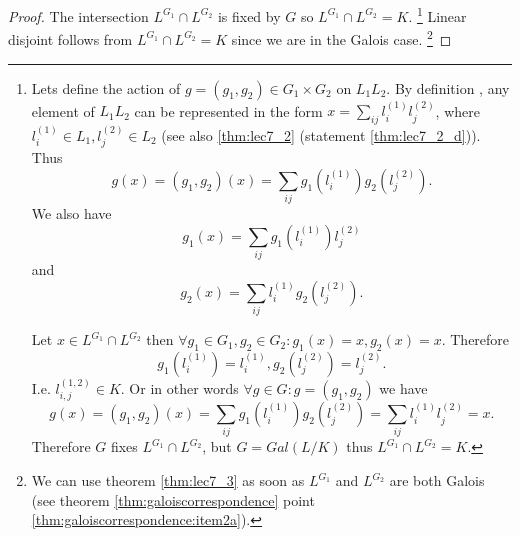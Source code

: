 \begin{proposition}
\begin{enumerate}
\begin{proof}
      The intersection $L^{G_1} \cap L^{G_2}$ is fixed by $G$ so
      $L^{G_1} \cap L^{G_2} = K$.
      \footnote{
        Lets define the action of $g = (g_1, g_2) \in G_1 \times G_2$
        on $L_1L_2$. By definition ,
        any element of $L_1L_2$ can be represented in the form $x =
        \sum_{ij} l_i^{(1)}l_j^{(2)}$, where
        $l_i^{(1)} \in L_1, l_j^{(2)} \in L_2$
        (see also \autoref{thm:lec7_2} (statement
        \ref{thm:lec7_2_d})). Thus
        \[
        g(x) = (g_1, g_2)(x) = \sum_{ij} 
        g_1\left(l_i^{(1)}\right)
        g_2\left(l_j^{(2)}\right).
        \]
        We also have
        \[
        g_1(x) = \sum_{ij} 
        g_1\left(l_i^{(1)}\right)
        l_j^{(2)}
        \]
        and
        \[
        g_2(x) = \sum_{ij} 
        l_i^{(1)}
        g_2\left(l_j^{(2)}\right).
        \]
        
        Let $x \in L^{G_1} \cap L^{G_2}$ then $\forall g_1 \in
        G_1, g_2 \in G_2: g_1(x) = x, g_2(x) = x$.
        Therefore
        \[
        g_1\left(l_i^{(1)}\right) = l_i^{(1)},
        g_2\left(l_j^{(2)}\right) = l_j^{(2)}.
        \]
        I.e. $l_{i,j}^{(1,2)} \in K$.
        Or in other words
        $\forall g \in G : g = (g_1, g_2)$ we have
        \[
        g(x) = (g_1, g_2)(x) = \sum_{ij} 
        g_1\left(l_i^{(1)}\right)
        g_2\left(l_j^{(2)}\right) =
        \sum_{ij} l_i^{(1)}l_j^{(2)} =
        x.
        \]
        Therefore $G$ fixes $L^{G_1} \cap L^{G_2}$, but
        $G = Gal\left(L/K\right)$ thus $L^{G_1} \cap L^{G_2} = K$.
      }
      Linear disjoint follows from
      $L^{G_1} \cap L^{G_2} = K$ since we are in the Galois case.
      \footnote{
        We can use theorem \ref{thm:lec7_3} as soon as
        $L^{G_1}$ and $L^{G_2}$ are both Galois
        (see theorem \ref{thm:galoiscorrespondence} point
        \ref{thm:galoiscorrespondence:item2a}).
      }
    \end{proof}
  \end{enumerate}
  \label{prop:lec7_3}
\end{proposition}


